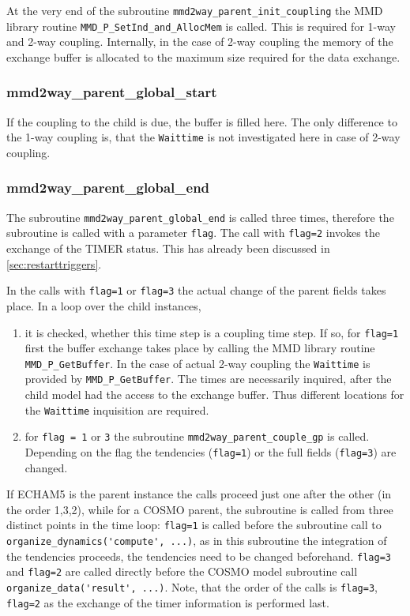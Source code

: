 \documentclass[11pt,twoside]{article}
\begin{document}
At the very end of the subroutine \verb|mmd2way_parent_init_coupling| the
MMD library routine \verb|MMD_P_SetInd_and_AllocMem| is called. This is
required for 1-way and 2-way coupling. Internally, in the case of 2-way
coupling the memory of the exchange buffer is allocated to the maximum size
required for the data exchange.

\subsubsection{mmd2way\_parent\_global\_start}
If the coupling to the child is due, the buffer is filled here. The only
difference to the 1-way coupling is, that the \verb|Waittime| is not
investigated here in case of 2-way coupling.

\subsubsection{mmd2way\_parent\_global\_end}
The subroutine \verb|mmd2way_parent_global_end| is called three times,
therefore the subroutine is called with a parameter \verb|flag|. 
The call with \verb|flag=2| invokes the exchange of the TIMER status. This has
already been discussed in \ref{sec:restarttriggers}.

In the calls with \verb|flag=1| or \verb|flag=3| the actual change of the
parent fields takes place. In a loop over the child instances, 
\begin{enumerate}
\item it is
checked, whether this time step is a coupling time step. If so,
for \verb|flag=1| first the buffer exchange takes place by calling the MMD
library routine \verb|MMD_P_GetBuffer|. In the case of actual 2-way coupling
the \verb|Waittime| is provided by \verb|MMD_P_GetBuffer|. The times are
necessarily inquired, after the child model had the access to the exchange
buffer. Thus different
locations for the \verb|Waittime| inquisition are required.
\item  for \verb|flag = 1| or \verb|3| the
subroutine \verb|mmd2way_parent_couple_gp| is called. Depending on the flag
the tendencies (\verb|flag=1|) or the full fields (\verb|flag=3|) are changed.
\end{enumerate}

If ECHAM5 is the parent instance the calls proceed just one after the other (in
the order 1,3,2), while
for a COSMO parent, the subroutine is called from three distinct points
in the time loop:
\verb|flag=1| is called before the subroutine call to  
\verb|organize_dynamics('compute', ...)|, as in this subroutine the
integration of the tendencies proceeds, the tendencies need to be changed
beforehand.
\verb|flag=3| and \verb|flag=2| are called directly before the COSMO model
subroutine call \verb|organize_data('result', ...)|. Note, that the order of
the calls is \verb|flag=3|, \verb|flag=2| as the exchange of the timer
information is performed last.
\end{document}
